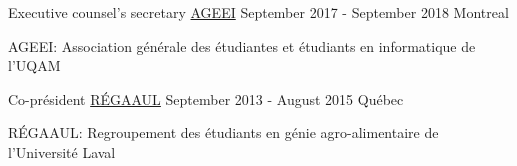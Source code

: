 

\begin{cventries}

  \cventry
    {Executive counsel's secretary}%
    {\href{https://ageei.uqam.ca}{AGEEI}}%
    {September 2017 - September 2018} %
    {Montreal} %
    {
      \begin{cvitems} %
        \item {AGEEI: Association générale des étudiantes et étudiants
               en informatique de l'UQAM}
      \end{cvitems}
    }

  \cventry
    {Co-président} %
    {\href{https://agetaac.asso.ulaval.ca/index.html}
          {RÉGAAUL}} %
    {September 2013 - August 2015} %
    {Québec} %
    {
      \begin{cvitems} %
        \item {RÉGAAUL: Regroupement des étudiants en génie agro-alimentaire de
              l'Université Laval}
      \end{cvitems}
    }

\end{cventries}
